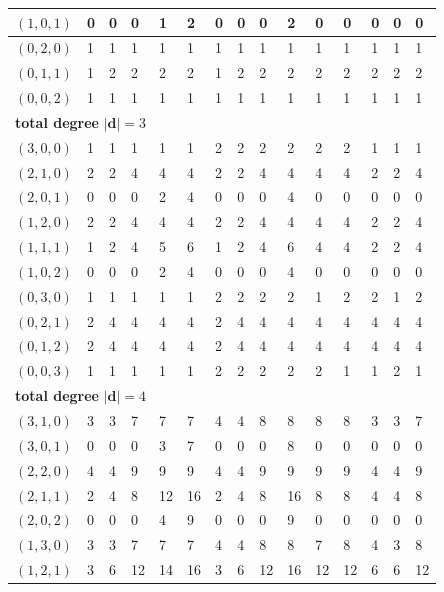 \documentclass{article}
\newcommand{\bd}{\mathbf{d}}
\begin{document}
\begin{longtable}{|l|l|l|l|l|l|l|l|l|l|l|l|l|l|l|}
$(1,0,1)$ & 0 & 0 & 0 & 1 & 2 & 0 & 0 & 0 & 2 & 0 & 0 & 0 & 0 & 0 \\ \hline
$(0,2,0)$ & 1 & 1 & 1 & 1 & 1 & 1 & 1 & 1 & 1 & 1 & 1 & 1 & 1 & 1 \\ \hline
$(0,1,1)$ & 1 & 2 & 2 & 2 & 2 & 1 & 2 & 2 & 2 & 2 & 2 & 2 & 2 & 2 \\ \hline
$(0,0,2)$ & 1 & 1 & 1 & 1 & 1 & 1 & 1 & 1 & 1 & 1 & 1 & 1 & 1 & 1 \\ \hline
\multicolumn{15}{|l|}{\textbf{total degree }$|\bd|=3$} \\ \hline
$(3,0,0)$ & 1 & 1 & 1 & 1 & 1 & 2 & 2 & 2 & 2 & 2 & 2 & 1 & 1 & 1 \\ \hline
$(2,1,0)$ & 2 & 2 & 4 & 4 & 4 & 2 & 2 & 4 & 4 & 4 & 4 & 2 & 2 & 4 \\ \hline
$(2,0,1)$ & 0 & 0 & 0 & 2 & 4 & 0 & 0 & 0 & 4 & 0 & 0 & 0 & 0 & 0 \\ \hline
$(1,2,0)$ & 2 & 2 & 4 & 4 & 4 & 2 & 2 & 4 & 4 & 4 & 4 & 2 & 2 & 4 \\ \hline
$(1,1,1)$ & 1 & 2 & 4 & 5 & 6 & 1 & 2 & 4 & 6 & 4 & 4 & 2 & 2 & 4 \\ \hline
$(1,0,2)$ & 0 & 0 & 0 & 2 & 4 & 0 & 0 & 0 & 4 & 0 & 0 & 0 & 0 & 0 \\ \hline
$(0,3,0)$ & 1 & 1 & 1 & 1 & 1 & 2 & 2 & 2 & 2 & 1 & 2 & 2 & 1 & 2 \\ \hline
$(0,2,1)$ & 2 & 4 & 4 & 4 & 4 & 2 & 4 & 4 & 4 & 4 & 4 & 4 & 4 & 4 \\ \hline
$(0,1,2)$ & 2 & 4 & 4 & 4 & 4 & 2 & 4 & 4 & 4 & 4 & 4 & 4 & 4 & 4 \\ \hline
$(0,0,3)$ & 1 & 1 & 1 & 1 & 1 & 2 & 2 & 2 & 2 & 2 & 1 & 1 & 2 & 1 \\ \hline
\multicolumn{15}{|l|}{\textbf{total degree }$|\bd|=4$} \\ \hline
$(3,1,0)$ & 3 & 3 & 7 & 7 & 7 & 4 & 4 & 8 & 8 & 8 & 8 & 3 & 3 & 7 \\ \hline
$(3,0,1)$ & 0 & 0 & 0 & 3 & 7 & 0 & 0 & 0 & 8 & 0 & 0 & 0 & 0 & 0 \\ \hline
$(2,2,0)$ & 4 & 4 & 9 & 9 & 9 & 4 & 4 & 9 & 9 & 9 & 9 & 4 & 4 & 9 \\ \hline
$(2,1,1)$ & 2 & 4 & 8 & 12 & 16 & 2 & 4 & 8 & 16 & 8 & 8 & 4 & 4 & 8 \\ \hline
$(2,0,2)$ & 0 & 0 & 0 & 4 & 9 & 0 & 0 & 0 & 9 & 0 & 0 & 0 & 0 & 0 \\ \hline
$(1,3,0)$ & 3 & 3 & 7 & 7 & 7 & 4 & 4 & 8 & 8 & 7 & 8 & 4 & 3 & 8 \\ \hline
$(1,2,1)$ & 3 & 6 & 12 & 14 & 16 & 3 & 6 & 12 & 16 & 12 & 12 & 6 & 6 & 12 \\ \hline

\end{longtable}
\end{document}
